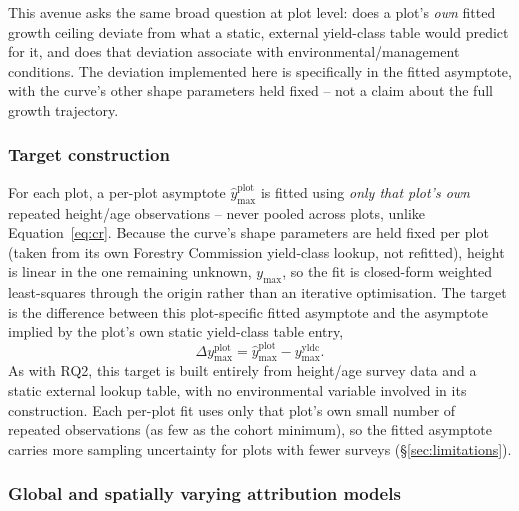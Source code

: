 This avenue asks the same broad question at plot level: does a plot's \emph{own} fitted growth
ceiling deviate from what a static, external yield-class table would predict for it, and does
that deviation associate with environmental/management conditions. The deviation implemented here
is specifically in the fitted asymptote, with the curve's other shape parameters held fixed --
not a claim about the full growth trajectory.

\subsubsection{Target construction}
\label{sec:rq3-target}

For each plot, a per-plot asymptote $\hat y_{\max}^{\text{plot}}$ is fitted using \emph{only that
plot's own} repeated height/age observations -- never pooled across plots, unlike
Equation~\ref{eq:cr}. Because the curve's shape parameters are held fixed per plot (taken from
its own Forestry Commission yield-class lookup, not refitted), height is linear in the one
remaining unknown, $y_{\max}$, so the fit is closed-form weighted least-squares through the
origin rather than an iterative optimisation. The target is the difference between this
plot-specific fitted asymptote and the asymptote implied by the plot's own static yield-class
table entry,
\begin{equation}
\Delta y_{\max}^{\text{plot}} = \hat y_{\max}^{\text{plot}} - y_{\max}^{\text{yldc}}.
\label{eq:local-ymax-diff}
\end{equation}
As with RQ2, this target is built entirely from height/age survey data and a static external
lookup table, with no environmental variable involved in its construction. Each per-plot fit uses
only that plot's own small number of repeated observations (as few as the cohort minimum), so the
fitted asymptote carries more sampling uncertainty for plots with fewer surveys
(\S\ref{sec:limitations}).

\subsubsection{Global and spatially varying attribution models}
\label{sec:rq3-models}

